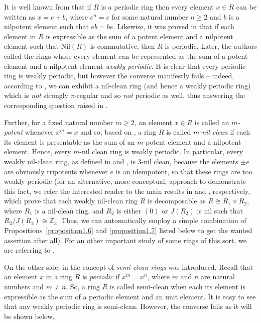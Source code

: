 \documentclass[12pt]{amsart}
\theoremstyle{definition}
\theoremstyle{remark}
\numberwithin{equation}{section}
\begin{document}
It is well known from \cite{CD} that if $R$ is a periodic ring then every element $x\in R$ can be written as $x=e+b$, where $e^n=e$ for some natural number $n \geq 2$ and $b$ is a nilpotent element such that $eb=be$. Likewise, it was proved in \cite{Bell} that if each element in $R$ is expressible as the sum of a potent element and a nilpotent element such that $\mathrm{Nil}(R)$ is commutative, then $R$ is periodic. Later, the authors called the rings whose every element can be represented as the sum of a potent element and a nilpotent element {\it weakly periodic}. It is clear that every periodic ring is weakly periodic, but however the converse manifestly fails -- indeed, according to \cite[Examples 3.1,3.2]{Ster}, we can exhibit a nil-clean ring (and hence a weakly periodic ring) which is {\it not} strongly $\pi$-regular and so {\it not} periodic as well, thus answering the corresponding question raised in \cite{Hirano}. 

Further, for a fixed natural number $m\geq 2$, an element $x\in R$ is called an {\it $m$-potent} whenever $x^m=x$ and so, based on \cite{BMA}, a ring $R$ is called {\it $m$-nil clean} if each its element is presentable as the sum of an $m$-potent element and a nilpotent element. Hence, every $m$-nil clean ring is weakly periodic. In particular, every weakly nil-clean ring, as defined in \cite{DMc} and \cite{BDZ}, is 3-nil clean, because the elements $\pm e$ are obviously tripotents whenever $e$ is an idempotent, so that these rings are too weakly periodic (for an alternative, more conceptual, approach to demonstrate this fact, we refer the interested reader to the main results in \cite{Dnew} and \cite{St}, respectively, which prove that each weakly nil-clean ring $R$ is decomposable as $R\cong R_1\times R_2$, where $R_1$ is a nil-clean ring, and $R_2$ is either $(0)$ or $J(R_2)$ is nil such that $R_2/J(R_2)\cong \mathbb{Z}_3$. Thus, we can automatically employ a simple combination of Propositions~\ref{proposition1.6} and \ref{proposition1.7} listed below to get the wanted assertion after all). For an other important study of some rings of this sort, we are referring to \cite{Di}.

On the other side, in \cite{Ye} the concept of {\it semi-clean rings} was introduced. Recall that an element $x$ in a ring $R$ is {\it periodic} if $x^m=x^n$, where $m$ and $n$ are natural numbers and $m \neq n$. So, a ring $R$ is called semi-clean when each its element is expressible as the sum of a periodic element and an unit element. It is easy to see that any weakly periodic ring is semi-clean. However, the converse fails as it will be shown below.
\end{document}
